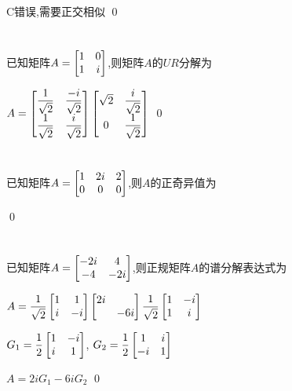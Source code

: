 \documentclass{matrix-homework}
\begin{document}
C错误,需要正交相似
\qed

\newpage
\section{}
已知矩阵$A=\begin{bmatrix}1&0\\1&i\end{bmatrix}$,则矩阵$A$的$UR$分解为

\answer
$A=\begin{bmatrix}\dfrac{1}{\sqrt{2}} & \dfrac{-i}{\sqrt{2}} \\ \dfrac{1}{\sqrt{2}} & \dfrac{i}{\sqrt{2}}\end{bmatrix} \begin{bmatrix}\sqrt{2} & \dfrac{i}{\sqrt{2}} \\ 0 & \dfrac{1}{\sqrt{2}}\end{bmatrix}$
\qed


\section{}
已知矩阵$A=\begin{bmatrix}1 & 2i & 2 \\ 0&0&0\end{bmatrix}$,则$A$的正奇异值为

\qed


\section{}
已知矩阵$A=\begin{bmatrix}-2i & 4 \\ -4 & -2i\end{bmatrix}$,则正规矩阵$A$的谱分解表达式为

\answer
$A=\dfrac{1}{\sqrt{2}}\begin{bmatrix}1&1 \\ i&-i\end{bmatrix}\begin{bmatrix}2i \\ &-6i\end{bmatrix} \dfrac{1}{\sqrt{2}}\begin{bmatrix}1&-i \\ 1&i\end{bmatrix}$

$G_1=\dfrac{1}{2}\begin{bmatrix}1&-i \\ i&1\end{bmatrix}$, $G_2=\dfrac{1}{2}\begin{bmatrix}1&i \\ -i&1\end{bmatrix}$

$A=2iG_1-6iG_2$
\qed
\end{document}
